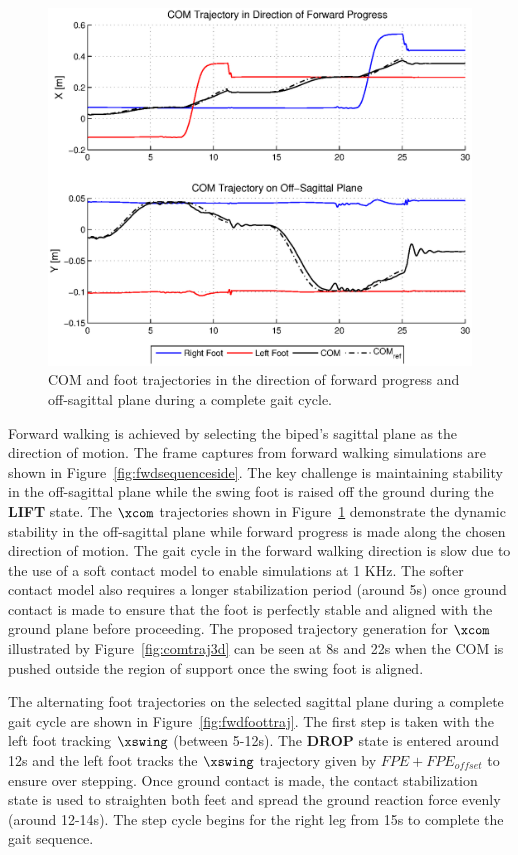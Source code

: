 \begin{figure}[!b]
	\centering
    \includegraphics[scale=0.7]{fig/simulations/fwdcomtraj.eps}
  	\caption{COM and foot trajectories in the direction of forward progress and off-sagittal plane during a complete gait cycle.}
	\label{fig:fwdcomtraj}
\end{figure}

Forward walking is achieved by selecting the biped's sagittal plane as the direction of motion. The frame captures from forward walking simulations are shown in Figure~\ref{fig:fwdsequenceside}. The key challenge is maintaining stability in the off-sagittal plane while the swing foot is raised off the ground during the \textbf{LIFT} state. The $\xcom$ trajectories shown in Figure~\ref{fig:fwdcomtraj} demonstrate the dynamic stability in the off-sagittal plane while forward progress is made along the chosen direction of motion. The gait cycle in the forward walking direction is slow due to the use of a soft contact model to enable simulations at 1 KHz. The softer contact model also requires a longer stabilization period (around 5s) once ground contact is made to ensure that the foot is perfectly stable and aligned with the ground plane before proceeding. The proposed trajectory generation for $\xcom$ illustrated by Figure~\ref{fig:comtraj3d} can be seen at 8s and 22s when the COM is pushed outside the region of support once the swing foot is aligned. 

The alternating foot trajectories on the selected sagittal plane during a complete gait cycle are shown in Figure~\ref{fig:fwdfoottraj}. The first step is taken with the left foot tracking $\xswing$ (between 5-12s). The \textbf{DROP} state is entered around 12s and the left foot tracks the $\xswing$ trajectory given by $FPE + FPE_{offset}$ to ensure over stepping. Once ground contact is made, the contact stabilization state is used to straighten both feet and spread the ground reaction force evenly (around 12-14s). The step cycle begins for the right leg from 15s to complete the gait sequence. 

